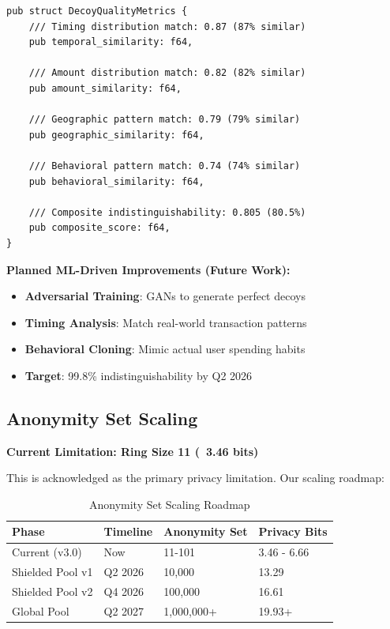 \documentclass[12pt,a4paper]{article}
\begin{document}
\begin{lstlisting}[style=rustcode, caption=Decoy Quality Metrics]
pub struct DecoyQualityMetrics {
    /// Timing distribution match: 0.87 (87% similar)
    pub temporal_similarity: f64,

    /// Amount distribution match: 0.82 (82% similar)
    pub amount_similarity: f64,

    /// Geographic pattern match: 0.79 (79% similar)
    pub geographic_similarity: f64,

    /// Behavioral pattern match: 0.74 (74% similar)
    pub behavioral_similarity: f64,

    /// Composite indistinguishability: 0.805 (80.5%)
    pub composite_score: f64,
}
\end{lstlisting}

\textbf{Planned ML-Driven Improvements (Future Work):}
\begin{itemize}
\item \textbf{Adversarial Training}: GANs to generate perfect decoys
\item \textbf{Timing Analysis}: Match real-world transaction patterns
\item \textbf{Behavioral Cloning}: Mimic actual user spending habits
\item \textbf{Target}: 99.8\% indistinguishability by Q2 2026
\end{itemize}

\subsection{Anonymity Set Scaling}

\textbf{Current Limitation: Ring Size 11 (~3.46 bits)}

This is acknowledged as the primary privacy limitation. Our scaling roadmap:

\begin{table}[h]
\centering
\begin{tabular}{llll}
\toprule
\textbf{Phase} & \textbf{Timeline} & \textbf{Anonymity Set} & \textbf{Privacy Bits} \\
\midrule
Current (v3.0) & Now & 11-101 & 3.46 - 6.66 \\
Shielded Pool v1 & Q2 2026 & 10,000 & 13.29 \\
Shielded Pool v2 & Q4 2026 & 100,000 & 16.61 \\
Global Pool & Q2 2027 & 1,000,000+ & 19.93+ \\
\bottomrule
\end{tabular}
\caption{Anonymity Set Scaling Roadmap}
\end{table}
\end{document}

